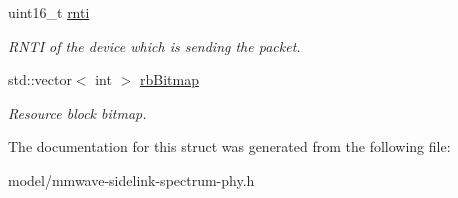 \begin{DoxyCompactItemize}
\mbox{\label{structns3_1_1millicar_1_1TbInfo__t_a81087edab29d0c02c7e23f1f9484fcdc}} 
uint16\+\_\+t \hyperlink{structns3_1_1millicar_1_1TbInfo__t_a81087edab29d0c02c7e23f1f9484fcdc}{rnti}
\begin{DoxyCompactList}\small\item\em R\+N\+TI of the device which is sending the packet. \end{DoxyCompactList}\item 
\mbox{\label{structns3_1_1millicar_1_1TbInfo__t_a4bb819dcf5cb940500997b5387012f4b}} 
std\+::vector$<$ int $>$ \hyperlink{structns3_1_1millicar_1_1TbInfo__t_a4bb819dcf5cb940500997b5387012f4b}{rb\+Bitmap}
\begin{DoxyCompactList}\small\item\em Resource block bitmap. \end{DoxyCompactList}\end{DoxyCompactItemize}


The documentation for this struct was generated from the following file\+:\begin{DoxyCompactItemize}
\item 
model/mmwave-\/sidelink-\/spectrum-\/phy.\+h\end{DoxyCompactItemize}
